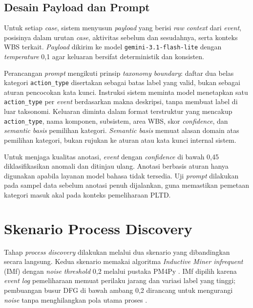 \subsection{Desain Payload dan Prompt}

Untuk setiap \textit{case}, sistem menyusun \textit{payload} yang berisi \textit{raw context} dari \textit{event}, posisinya dalam urutan \textit{case}, aktivitas sebelum dan sesudahnya, serta konteks WBS terkait. \textit{Payload} dikirim ke model \texttt{gemini-3.1-flash-lite} dengan \textit{temperature} 0,1 agar keluaran bersifat deterministik dan konsisten.

Perancangan \textit{prompt} mengikuti prinsip \textit{taxonomy boundary}: daftar dua belas kategori \texttt{action\_type} disertakan sebagai batas label yang valid, bukan sebagai aturan pencocokan kata kunci. Instruksi sistem meminta model menetapkan satu \texttt{action\_type} per \textit{event} berdasarkan makna deskripsi, tanpa membuat label di luar taksonomi. Keluaran diminta dalam format terstruktur yang mencakup \texttt{action\_type}, nama komponen, subsistem, area WBS, skor \textit{confidence}, dan \textit{semantic basis} pemilihan kategori. \textit{Semantic basis} memuat alasan domain atas pemilihan kategori, bukan rujukan ke aturan atau kata kunci internal sistem.

Untuk menjaga kualitas anotasi, \textit{event} dengan \textit{confidence} di bawah 0,45 diklasifikasikan anomali dan ditinjau ulang. Anotasi berbasis aturan hanya digunakan apabila layanan model bahasa tidak tersedia. Uji \textit{prompt} dilakukan pada sampel data sebelum anotasi penuh dijalankan, guna memastikan pemetaan kategori masuk akal pada konteks pemeliharaan PLTD.

\section{Skenario Process Discovery}

Tahap \textit{process discovery} dilakukan melalui dua skenario yang dibandingkan secara langsung. Kedua skenario memakai algoritma \textit{Inductive Miner infrequent} (IMf) dengan \textit{noise threshold} 0,2 melalui pustaka PM4Py \cite{leemans2013discovering, berti2019pm4py}. IMf dipilih karena \textit{event log} pemeliharaan memuat perilaku jarang dan variasi label yang tinggi; pembuangan busur DFG di bawah ambang 0,2 dirancang untuk mengurangi \textit{noise} tanpa menghilangkan pola utama proses \cite{leemans2013discovering, augusto2019automated}.

